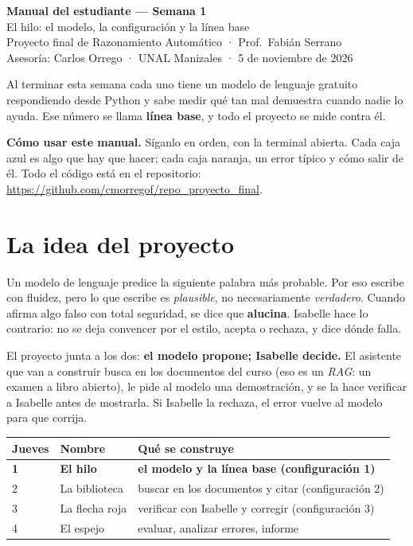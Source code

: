 \documentclass[11pt,a4paper]{article}
\begin{document}
\begin{center}
  {\LARGE\sffamily\bfseries\color{humano} Manual del estudiante --- Semana 1}\\[0.4em]
  {\large El hilo: el modelo, la configuración y la línea base}\\[0.6em]
  {\sffamily\small\color{gray} Proyecto final de Razonamiento Automático · Prof.\ Fabián Serrano\\
  Asesoría: Carlos Orrego · UNAL Manizales · 5 de noviembre de 2026}
\end{center}

\begin{idea}
  Al terminar esta semana cada uno tiene un modelo de lenguaje gratuito
  respondiendo desde Python y sabe medir qué tan mal demuestra cuando
  nadie lo ayuda. Ese número se llama \textbf{línea base}, y todo el
  proyecto se mide contra él.
\end{idea}

\textbf{Cómo usar este manual.} Síganlo en orden, con la terminal
abierta. Cada caja azul es algo que hay que hacer; cada caja naranja,
un error típico y cómo salir de él. Todo el código está en el repositorio:
\url{https://github.com/cmorregof/repo_proyecto_final}.

\section{La idea del proyecto}

Un modelo de lenguaje predice la siguiente palabra más probable. Por eso
escribe con fluidez, pero lo que escribe es \emph{plausible}, no
necesariamente \emph{verdadero}. Cuando afirma algo falso con total
seguridad, se dice que \textbf{alucina}. Isabelle hace lo contrario: no
se deja convencer por el estilo, acepta o rechaza, y dice dónde falla.

El proyecto junta a los dos: \textbf{el modelo propone; Isabelle
decide.} El asistente que van a construir busca en los documentos del
curso (eso es un \emph{RAG}: un examen a libro abierto), le pide al
modelo una demostración, y se la hace verificar a Isabelle antes de
mostrarla. Si Isabelle la rechaza, el error vuelve al modelo para que
corrija.

\begin{center}
\small
\begin{tabular}{@{}lll@{}}
  \toprule
  Jueves & Nombre & Qué se construye \\
  \midrule
  \textbf{1} & \textbf{El hilo} & \textbf{el modelo y la línea base (configuración 1)} \\
  2 & La biblioteca & buscar en los documentos y citar (configuración 2) \\
  3 & La flecha roja & verificar con Isabelle y corregir (configuración 3) \\
  4 & El espejo & evaluar, analizar errores, informe \\
  \bottomrule
\end{tabular}
\end{center}
\end{document}
